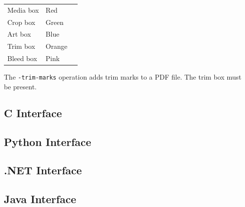 \documentclass{book}
\begin{document}
\medskip
\begin{tabular}{lll}
  Media box & Red& \\
  Crop box & Green& \\
  Art box & Blue& \\
  Trim box & Orange& \\
  Bleed box & Pink& 
\end{tabular}
\medskip

\noindent  The \texttt{-trim-marks} operation adds trim marks to a PDF file. The trim box must be present.
\thispagestyle{fancy}

\begin{cpdflib}
\clearpage
\section*{C Interface}
\begin{small}\tt

\end{small}
\end{cpdflib}

\begin{pycpdflib}
\clearpage
\section*{Python Interface}
\begin{small}\tt

\end{small}
\end{pycpdflib}

\begin{dotnetcpdflib}
\clearpage
\section*{.NET Interface}
\begin{small}\tt

\end{small}
\end{dotnetcpdflib}

\begin{jcpdflib}
\clearpage
\section*{Java Interface}
\begin{small}\tt

\end{small}
\end{jcpdflib}
\end{document}

